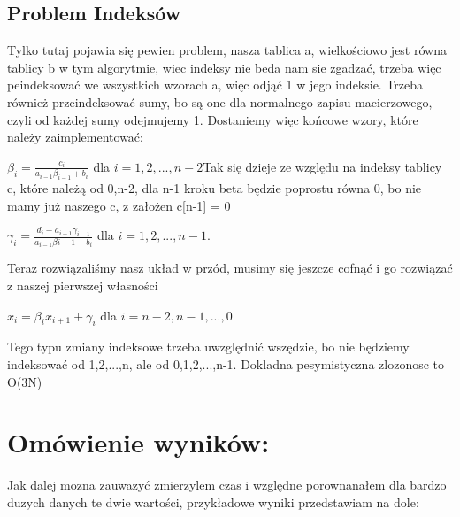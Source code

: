 \documentclass[12pt]{article}
\begin{document}
\subsection{Problem Indeksów}
Tylko tutaj pojawia się pewien problem, nasza tablica a, wielkościowo jest równa tablicy b w tym algorytmie, wiec indeksy nie beda nam sie zgadzać, trzeba więc peindeksować we wszystkich wzorach a, więc odjąć 1 w jego indeksie. Trzeba również przeindeksować sumy, bo są one dla normalnego zapisu macierzowego, czyli od każdej sumy odejmujemy 1. Dostaniemy więc końcowe wzory, które należy zaimplementować:
\begin{center}
$\beta_{i} = \frac{c_{i}}{a_{i-1}\beta_{i-1}+b_{i}}$ dla $i=1,2,...,n-2$\newline\newline Tak się dzieje ze względu na indeksy tablicy c, które należą od 0,n-2, dla n-1 kroku beta będzie poprostu równa 0, bo nie mamy już naszego c, z założen c[n-1] = 0
\end{center}
\begin{center}
$\gamma_{i} = \frac{d_{i}-a_{i-1}\gamma_{i-1}}{a_{i-1}\beta{i-1}+b_{i}}$ dla $i=1,2,...,n-1$.\newline\newline
\end{center}
Teraz rozwiązaliśmy nasz układ w przód, musimy się jeszcze cofnąć i go rozwiązać z naszej pierwszej własności 
\begin{center}
$x_{i} = \beta_{i}x_{i+1}+\gamma_{i}$ dla $i = n-2, n-1,...,0$
\end{center}
Tego typu zmiany indeksowe trzeba uwzględnić wszędzie, bo nie będziemy indeksować od 1,2,...,n, ale od 0,1,2,...,n-1.
Dokladna pesymistyczna zlozonosc to O(3N)
\section{Omówienie wyników:}
Jak dalej mozna zauwazyć zmierzylem czas i względne porownanałem dla bardzo duzych danych te dwie wartości, przykładowe wyniki przedstawiam na dole:
\end{document}
